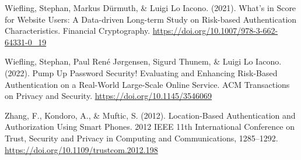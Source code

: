 \begin{thebibliography}{99}
    Wiefling, Stephan, Markus Dürmuth, \& Luigi Lo Iacono. (2021). What’s in Score for Website Users: A Data-driven Long-term Study on Risk-based Authentication Characteristics. Financial Cryptography. \url{https://doi.org/10.1007/978-3-662-64331-0_19}
    
    Wiefling, Stephan, Paul René Jørgensen, Sigurd Thunem, \& Luigi Lo Iacono. (2022). Pump Up Password Security! Evaluating and Enhancing Risk-Based Authentication on a Real-World Large-Scale Online Service. ACM Transactions on Privacy and Security. \url{https://doi.org/10.1145/3546069}
    
    Zhang, F., Kondoro, A., \& Muftic, S. (2012). Location-Based Authentication and Authorization Using Smart Phones. 2012 IEEE 11th International Conference on Trust, Security and Privacy in Computing and Communications, 1285–1292. \url{https://doi.org/10.1109/trustcom.2012.198}
\end{thebibliography}
